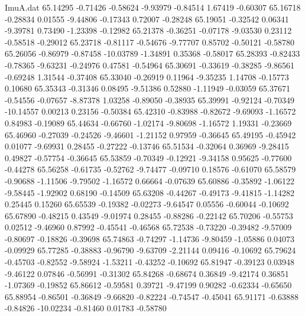 \begin{filecontents}{ImuA.dat}
  65.14295   -0.71426   -0.58624   -9.93979   -0.84514    1.67419   -0.60307
  65.16718   -0.28834    0.01555   -9.44806   -0.17343    0.72007   -0.28248
  65.19051   -0.32542    0.06341   -9.39781    0.73490   -1.23398   -0.12982
  65.21378   -0.36251   -0.07178   -9.03530    0.23112   -0.58518   -0.29012
  65.23718   -0.81117   -0.54676   -9.77707    0.85702   -0.50121   -0.58780
  65.26056   -0.86979   -0.87458  -10.03789   -1.34891    0.35368   -0.58017
  65.28393   -0.82433   -0.78365   -9.63231   -0.24976    0.47581   -0.54964
  65.30691   -0.33619   -0.38285   -9.86561   -0.69248    1.31544   -0.37408
  65.33040   -0.26919    0.11964   -9.35235    1.14708   -0.15773    0.10680
  65.35343   -0.31346    0.08495   -9.51386    0.52880   -1.11949   -0.03059
  65.37671   -0.54556   -0.07657   -8.87378    1.03258   -0.89050   -0.38935
  65.39991   -0.92124   -0.70349  -10.14557    0.00213    0.23156   -0.50384
  65.42310   -0.83988   -0.82672   -9.69093   -1.16572    0.84983   -0.19089
  65.44634   -0.66760   -1.02174   -9.80698   -1.16572    1.19331   -0.23669
  65.46960   -0.27039   -0.24526   -9.46601   -1.21152    0.97959   -0.36645
  65.49195   -0.45942    0.01077   -9.69931    0.28455   -0.27222   -0.13746
  65.51534   -0.32064    0.36969   -9.28415    0.49827   -0.57754   -0.36645
  65.53859   -0.70349   -0.12921   -9.34158    0.95625   -0.77600   -0.44278
  65.56258   -0.61735   -0.52762   -9.74477   -0.09710    0.18576   -0.61070
  65.58579   -0.90688   -1.11506   -9.79502   -1.16572    0.66664   -0.07639
  65.60886   -0.35892   -1.06122   -9.58445   -1.92902    0.68190   -0.14509
  65.63208   -0.44267   -0.49173   -9.41815   -1.14282    0.25445    0.15260
  65.65539   -0.19382   -0.02273   -9.64547    0.05556   -0.60044   -0.10692
  65.67890   -0.48215    0.43549   -9.01974    0.28455   -0.88286   -0.22142
  65.70206   -0.55753    0.02512   -9.46960    0.87992   -0.45541   -0.46568
  65.72538   -0.73220   -0.39482   -9.57009   -0.80697   -0.18826   -0.39698
  65.74863   -0.74297   -1.14736   -9.80459   -1.05886    0.04073   -0.09929
  65.77285   -0.38883   -0.96790   -9.63709   -2.21144    0.09416   -0.10692
  65.79624   -0.45703   -0.82552   -9.58924   -1.53211   -0.43252   -0.10692
  65.81947   -0.39123    0.03948   -9.46122    0.07846   -0.56991   -0.31302
  65.84268   -0.68674    0.36849   -9.42174    0.36851   -1.07369   -0.19852
  65.86612   -0.59581    0.39721   -9.47199    0.90282   -0.62334   -0.65650
  65.88954   -0.86501   -0.36849   -9.66820   -0.82224   -0.74547   -0.45041
  65.91171   -0.63888   -0.84826  -10.02234   -0.81460    0.01783   -0.58780

\end{filecontents}
